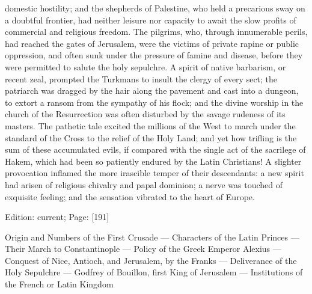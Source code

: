 domestic hostility; and the shepherds of Palestine, who held a precarious sway on a doubtful frontier, had neither leisure nor capacity to await the slow profits of commercial and religious freedom. The pilgrims, who, through innumerable perils, had reached the gates of Jerusalem, were the victims of private rapine or public oppression, and often sunk under the pressure of famine and disease, before they were permitted to salute the holy sepulchre. A spirit of native barbarism, or recent zeal, prompted the Turkmans to insult the clergy of every sect; the patriarch was dragged by the hair along the pavement and cast into a dungeon, to extort a ransom from the sympathy of his flock; and the divine worship in the church of the Resurrection was often disturbed by the savage rudeness of its masters. The pathetic tale excited the millions of the West to march under the standard of the Cross to the relief of the Holy Land; and yet how trifling is the sum of these accumulated evils, if compared with the single act of the sacrilege of Hakem, which had been so patiently endured by the Latin Christians! A slighter provocation inflamed the more irascible temper of their descendants: a new spirit had arisen of religious chivalry and papal dominion; a nerve was touched of exquisite feeling; and the sensation vibrated to the heart of Europe.

Edition: current; Page: [191]


Origin and Numbers of the First Crusade \texthebrew{—} Characters of the Latin Princes \texthebrew{—} Their March to Constantinople \texthebrew{—} Policy of the Greek Emperor Alexius \texthebrew{—} Conquest of Nice, Antioch, and Jerusalem, by the Franks \texthebrew{—} Deliverance of the Holy Sepulchre \texthebrew{—} Godfrey of Bouillon, first King of Jerusalem \texthebrew{—} Institutions of the French or Latin Kingdom

